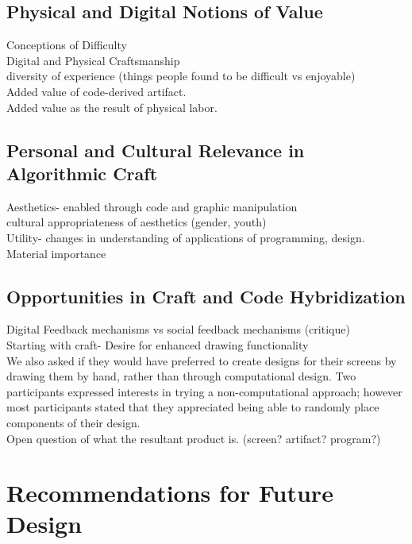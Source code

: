 \documentclass{sigchi}
\begin{document}
\subsection{Physical and Digital Notions of Value}
Conceptions of Difficulty\\
Digital and Physical Craftsmanship\\
diversity of experience (things people found to be difficult vs enjoyable)\\
Added value of code-derived artifact.\\
Added value as the result of physical labor.

\subsection{Personal and Cultural Relevance in Algorithmic Craft}
Aesthetics- enabled through code and graphic manipulation\\
cultural appropriateness of aesthetics (gender, youth)\\
Utility- changes in understanding of applications of programming, design.
Material importance

\subsection{Opportunities in Craft and Code Hybridization}
Digital Feedback mechanisms vs social feedback mechanisms (critique)\\
Starting with craft- Desire for enhanced drawing functionality\\
We also asked if they would have preferred to create designs for their screens by drawing them by hand, rather than through computational design. Two participants expressed interests in trying a non-computational approach; however most participants stated that they appreciated being able to randomly place components of their design.\\
Open question of what the resultant product is. (screen? artifact? program?)

\section{Recommendations for Future Design}
\end{document}
